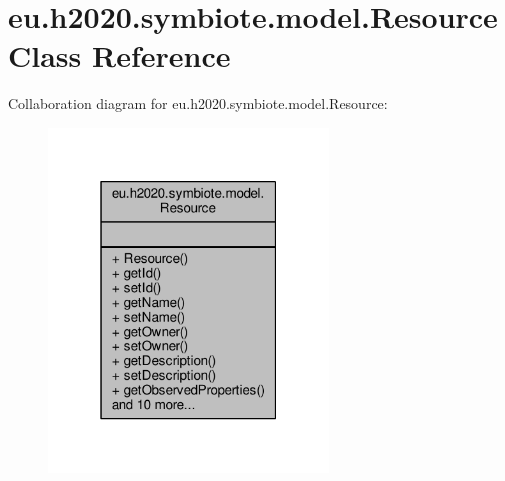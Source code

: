 \hypertarget{classeu_1_1h2020_1_1symbiote_1_1model_1_1Resource}{}\section{eu.\+h2020.\+symbiote.\+model.\+Resource Class Reference}
\label{classeu_1_1h2020_1_1symbiote_1_1model_1_1Resource}


Collaboration diagram for eu.\+h2020.\+symbiote.\+model.\+Resource\+:
\nopagebreak
\begin{figure}[H]
\begin{center}
\leavevmode
\includegraphics[width=211pt]{classeu_1_1h2020_1_1symbiote_1_1model_1_1Resource__coll__graph}
\end{center}
\end{figure}
